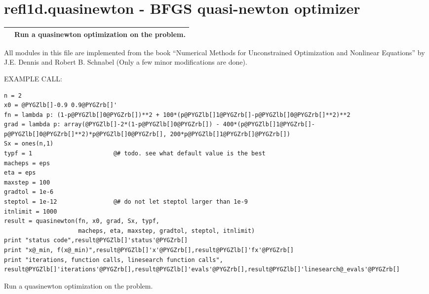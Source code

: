 \documentclass[letterpaper,10pt,english]{sphinxmanual}
\begin{document}
\section{refl1d.quasinewton - BFGS quasi-newton optimizer}
\label{api/quasinewton:refl1d-quasinewton-bfgs-quasi-newton-optimizer}\label{api/quasinewton::doc}
\begin{tabulary}{\linewidth}{LL}
\hline

{\hyperref[api/quasinewton:refl1d.quasinewton.quasinewton]{}}
 & 
Run a quasinewton optimization on the problem.
\\
\hline
\end{tabulary}

\label{api/quasinewton:module-refl1d.quasinewton}
All modules in this file are implemented from the book
``Numerical Methods for Unconstrained Optimization and Nonlinear Equations'' by
J.E. Dennis and Robert B. Schnabel (Only a few minor modifications are done).

EXAMPLE CALL:

\begin{Verbatim}[commandchars=@\[\]]
n = 2
x0 = @PYGZlb[]-0.9 0.9@PYGZrb[]'
fn = lambda p: (1-p@PYGZlb[]0@PYGZrb[])**2 + 100*(p@PYGZlb[]1@PYGZrb[]-p@PYGZlb[]0@PYGZrb[]**2)**2
grad = lambda p: array(@PYGZlb[]-2*(1-p@PYGZlb[]0@PYGZrb[]) - 400*(p@PYGZlb[]1@PYGZrb[]-p@PYGZlb[]0@PYGZrb[]**2)*p@PYGZlb[]0@PYGZrb[], 200*p@PYGZlb[]1@PYGZrb[]@PYGZrb[])
Sx = ones(n,1)
typf = 1                       @# todo. see what default value is the best
macheps = eps
eta = eps
maxstep = 100
gradtol = 1e-6
steptol = 1e-12                @# do not let steptol larger than 1e-9
itnlimit = 1000
result = quasinewton(fn, x0, grad, Sx, typf,
                     macheps, eta, maxstep, gradtol, steptol, itnlimit)
print "status code",result@PYGZlb[]'status'@PYGZrb[]
print "x@_min, f(x@_min)",result@PYGZlb[]'x'@PYGZrb[],result@PYGZlb[]'fx'@PYGZrb[]
print "iterations, function calls, linesearch function calls",          result@PYGZlb[]'iterations'@PYGZrb[],result@PYGZlb[]'evals'@PYGZrb[],result@PYGZlb[]'linesearch@_evals'@PYGZrb[]
\end{Verbatim}

\begin{fulllineitems}
\label{api/quasinewton:refl1d.quasinewton.quasinewton}
Run a quasinewton optimization on the problem.

\end{fulllineitems}
\end{document}
